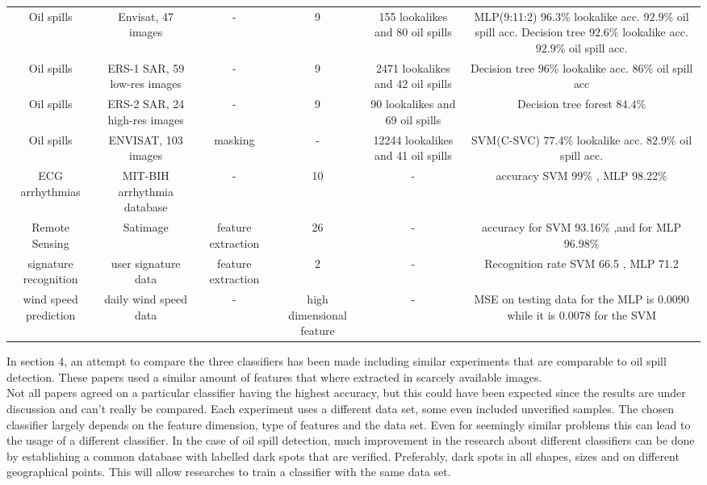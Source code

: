 \begin{table*}[t]
\begin{tabular}{*{6}{c}}
    Oil spills\cite{Mera201472} &  Envisat, 47 images & - & 9 & 155 lookalikes and 80 oil spills & MLP(9:11:2) $96.3$\% lookalike acc. $92.9$\% oil spill acc. Decision tree $92.6$\% lookalike acc. $92.9$\% oil spill acc.\\
    
    Oil spills\cite{Delfrate1996} &  ERS-1 SAR, 59 low-res images & - & 9 & 2471 lookalikes and 42 oil spills & Decision tree $96$\% lookalike acc. $86$\% oil spill acc\\
    
    Oil spills\cite{Topouzelis201268} &  ERS-2 SAR, 24 high-res images & - & 9 & 90 lookalikes and 69 oil spills & Decision tree forest $84.4$\%\\ 
    
    Oil spills\cite{brekke2008classifiers} & ENVISAT, 103 images & masking & - & 12244 lookalikes and 41 oil spills & SVM(C-SVC) $77.4$\% lookalike acc. $82.9$\% oil spill acc.\\

    ECG arrhythmias\cite{Moavenian20103088} & MIT-BIH arrhythmia database & - & 10 & - & accuracy SVM 99\% , MLP 98.22\% \\

    Remote Sensing\cite{Zanaty2012177} & Satimage & feature extraction & 26& - & accuracy for SVM 93.16\% ,and for MLP 96.98\%\\
    
    signature recognition\cite{FriasMartinez2006693} & user signature data &feature extraction& 2 & - & Recognition rate SVM 66.5  , MLP 71.2\\
    wind speed prediction\cite{Mohandes2004939}& daily wind speed data & - &high dimensional feature & - & MSE on testing data for the MLP is 0.0090 while it is 0.0078 for the SVM\\
    
    
\end{tabular}
\end{table*}


In section 4, an attempt to compare the three classifiers has been made including similar experiments that are comparable to oil spill detection. These papers used a similar amount of features that where extracted in scarcely available images. \\ Not all papers agreed on a particular classifier having the highest accuracy, but this could have been expected since the results are under discussion and can't really be compared. Each experiment uses a different data set, some even included unverified samples. The chosen classifier largely depends on the feature dimension, type of features and the data set. Even for seemingly similar problems this can lead to the usage of a different classifier. In the case of oil spill detection, much improvement in the research about different classifiers can be done by establishing a common database with labelled dark spots that are verified. Preferably, dark spots in all shapes, sizes and on different geographical points. This will allow researches to train a classifier with the same data set.